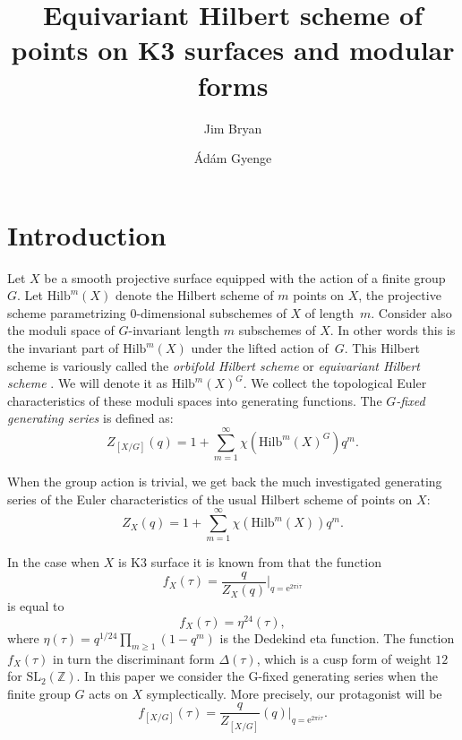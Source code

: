 \documentclass[11pt,a4paper]{amsart}
\title{Equivariant Hilbert scheme of points on K3 surfaces and modular forms}
\author{Jim Bryan}
\author{\'Ad\'am Gyenge}
\theoremstyle{definition}
\newcommand{\SZ}{\mathbb{Z}}                    %
\begin{document}
\maketitle

\tableofcontents


\section{Introduction}

Let $X$ be a smooth projective surface equipped with the action of a finite group $G$. Let $\mathrm{Hilb}^m(X)$ denote the Hilbert scheme of $m$ points on $X$, the projective scheme parametrizing $0$-dimensional subschemes of $X$ of length~$m$.
Consider also the moduli space of $G$-invariant length $m$ subschemes of $X$. In other words this is the invariant part of $\mathrm{Hilb}^m(X)$ under the lifted action of~$G$. 
This Hilbert scheme is variously called the \textit{orbifold Hilbert scheme} \cite{young2010generating} or \textit{equivariant Hilbert scheme} \cite{gusein2010generating}. We will denote it as $\mathrm{Hilb}^m(X)^G$.
We collect the topological Euler characteristics of these moduli spaces into generating functions. The \textit{$G$-fixed generating series} is defined as:
\[Z_{[X/G]}(q)= 1+\sum_{m=1}^{\infty}  \chi( \mathrm{Hilb}^m(X)^G) q^m.\]

When the group action is trivial, we get back the much investigated generating series of the Euler characteristics of the usual Hilbert scheme of points on $X$:
\[Z_{X}(q)= 1+\sum_{m=1}^{\infty}  \chi( \mathrm{Hilb}^m(X)) q^m.\]

In the case when $X$ is K3 surface it is known from \cite{gottsche1990betti} that the function 
\[ f_{X}(\tau)=\frac{q}{Z_{X}(q)}\Big|_{q=\mathrm{e}^{2 \pi i \tau}}\] 
is equal to 
\[ f_{X}(\tau)=\eta^{24}(\tau), \]
where $\eta(\tau)=q^{1/24}\prod_{m\geq 1}(1-q^m)$ is the Dedekind eta function.
The function $f_{X}(\tau)$ in turn the discriminant form $\Delta(\tau)$, which is a cusp form of weight $12$ for $\mathrm{SL}_2(\SZ)$. In this paper we consider the G-fixed generating series when the finite group $G$ acts on $X$ symplectically. More precisely, our protagonist will be
\[ f_{[X/G]}(\tau)=\frac{q}{Z_{[X/G]}}(q)\Big|_{q=\mathrm{e}^{2 \pi i \tau}}.\] 
\end{document}
